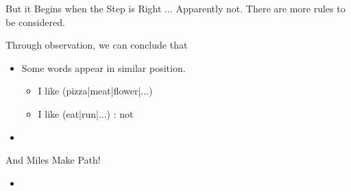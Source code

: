 \documentclass{beamer}
\begin{document}
\begin{frame}[allowframebreaks]{But it Begins when the Step is Right}
... Apparently not. There are more rules to be considered.

\framebreak

Through observation, we can conclude that

\begin{itemize}
\item Some words appear in similar position.
\begin{itemize}
\item I like (pizza|meat|flower|...)
\item I like (eat|run|...) : not
\end{itemize}
\item
\end{itemize}



\end{frame}

\begin{frame}{And Miles Make Path!}
\begin{itemize}
\item
\end{itemize}
\end{frame}




\begin{frame}[allowframebreaks]



\end{frame}
\end{document}
